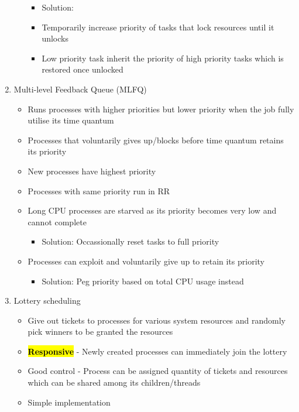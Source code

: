 \documentclass{article}
\newcommand{\keyword}[2][]{\sethlcolor{highlight}\hl{\textbf{#2}} #1 - }
\begin{document}
\begin{small}
\begin{multicols*}{3}
\begin{enumerate}
\begin{itemize}
		\begin{itemize}
			\item Solution:
			\item Temporarily increase priority of tasks that lock resources until it unlocks
			\item Low priority task inherit the priority of high priority tasks which is restored once unlocked
		\end{itemize}
	\end{itemize}
	\item Multi-level Feedback Queue (MLFQ)
	\begin{itemize}
		\item Runs processes with higher priorities but lower priority when the job fully utilise its time quantum
		\item Processes that voluntarily gives up/blocks before time quantum retains its priority
		\item New processes have highest priority
		\item Processes with same priority run in RR
		\item Long CPU processes are starved as its priority becomes very low and cannot complete
		\begin{itemize}
			\item Solution: Occassionally reset tasks to full priority 
		\end{itemize}
		\item Processes can exploit and voluntarily give up to retain its priority
		\begin{itemize}
			\item Solution: Peg priority based on total CPU usage instead 
		\end{itemize}
	\end{itemize}
	\item Lottery scheduling
	\begin{itemize}
		\item Give out tickets to processes for various system resources and randomly pick winners to be granted the resources
		\item \keyword{Responsive}{Newly created processes can immediately join the lottery}
		\item Good control - Process can be assigned quantity of tickets and resources which can be shared among its children/threads
		\item Simple implementation
	\end{itemize}
\end{enumerate}

\end{multicols*}
\end{small}
\end{document}
